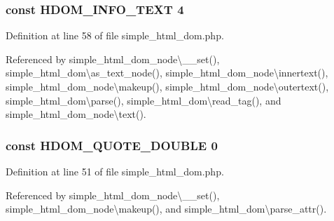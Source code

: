 \hypertarget{simple__html__dom_8php_a12f107a4dccc35d4321ff20028fbd476}{}
\subsubsection[{H\+D\+O\+M\+\_\+\+I\+N\+F\+O\+\_\+\+T\+E\+X\+T}]{\setlength{\rightskip}{0pt plus 5cm}const H\+D\+O\+M\+\_\+\+I\+N\+F\+O\+\_\+\+T\+E\+X\+T 4}\label{simple__html__dom_8php_a12f107a4dccc35d4321ff20028fbd476}


Definition at line 58 of file simple\+\_\+html\+\_\+dom.\+php.



Referenced by simple\+\_\+html\+\_\+dom\+\_\+node\textbackslash{}\+\_\+\+\_\+set(), simple\+\_\+html\+\_\+dom\textbackslash{}as\+\_\+text\+\_\+node(), simple\+\_\+html\+\_\+dom\+\_\+node\textbackslash{}innertext(), simple\+\_\+html\+\_\+dom\+\_\+node\textbackslash{}makeup(), simple\+\_\+html\+\_\+dom\+\_\+node\textbackslash{}outertext(), simple\+\_\+html\+\_\+dom\textbackslash{}parse(), simple\+\_\+html\+\_\+dom\textbackslash{}read\+\_\+tag(), and simple\+\_\+html\+\_\+dom\+\_\+node\textbackslash{}text().

\hypertarget{simple__html__dom_8php_a827ba5d43b28b0019b25bfdc4c7e2715}{}
\subsubsection[{H\+D\+O\+M\+\_\+\+Q\+U\+O\+T\+E\+\_\+\+D\+O\+U\+B\+L\+E}]{\setlength{\rightskip}{0pt plus 5cm}const H\+D\+O\+M\+\_\+\+Q\+U\+O\+T\+E\+\_\+\+D\+O\+U\+B\+L\+E 0}\label{simple__html__dom_8php_a827ba5d43b28b0019b25bfdc4c7e2715}


Definition at line 51 of file simple\+\_\+html\+\_\+dom.\+php.



Referenced by simple\+\_\+html\+\_\+dom\+\_\+node\textbackslash{}\+\_\+\+\_\+set(), simple\+\_\+html\+\_\+dom\+\_\+node\textbackslash{}makeup(), and simple\+\_\+html\+\_\+dom\textbackslash{}parse\+\_\+attr().

